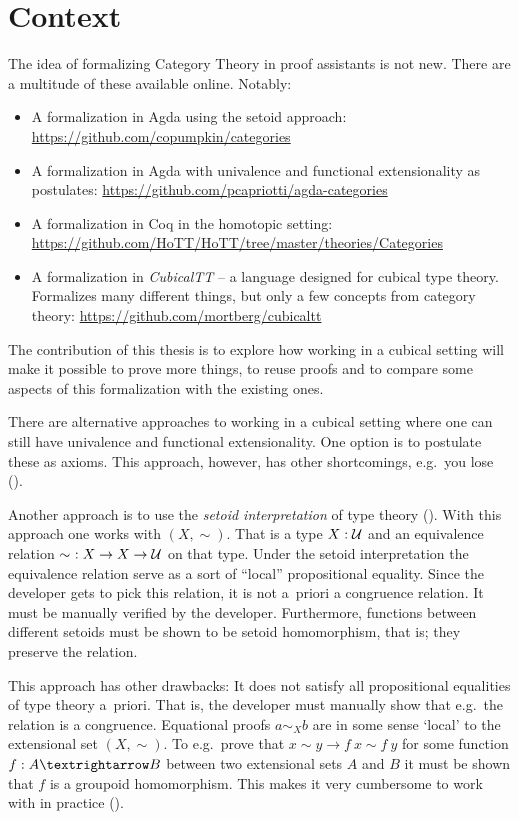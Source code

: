 \section{Context}
\label{sec:context}
%
The idea of formalizing Category Theory in proof assistants is not new.  There
are a multitude of these available online.  Notably:
%
\begin{itemize}
\item
  A formalization in Agda using the setoid approach:
  \url{https://github.com/copumpkin/categories}
\item
  A formalization in Agda with univalence and functional
  extensionality as postulates:
  \url{https://github.com/pcapriotti/agda-categories}
\item
  A formalization in Coq in the homotopic setting:
  \url{https://github.com/HoTT/HoTT/tree/master/theories/Categories}
\item
  A formalization in \emph{CubicalTT} -- a language designed for
  cubical type theory.  Formalizes many different things, but only a
  few concepts from category theory:
  \url{https://github.com/mortberg/cubicaltt}
\end{itemize}
%
The contribution of this thesis is to explore how working in a cubical
setting will make it possible to prove more things, to reuse proofs
and to compare some aspects of this formalization with the existing
ones.

There are alternative approaches to working in a cubical setting where
one can still have univalence and functional extensionality.  One
option is to postulate these as axioms.  This approach, however, has
other shortcomings, e.g.\ you lose 
(\cite[p.\ 3]{huber-2016}).

Another approach is to use the \emph{setoid interpretation} of type
theory (\cite{hofmann-1995,huber-2016}). With this approach one works
with  $(X, \sim)$. That is a type $X \mathrel{:}
\mathcal{U}$ and an equivalence relation $\sim\ \mathrel{:} X \to X \to \mathcal{U}$ on that
type. Under the setoid interpretation the equivalence relation serve
as a sort of ``local'' propositional equality. Since the developer
gets to pick this relation, it is not a~priori a congruence
relation. It must be manually verified by the developer.  Furthermore,
functions between different setoids must be shown to be setoid
homomorphism, that is; they preserve the relation.

This approach has other drawbacks: It does not satisfy all
propositional equalities of type theory a~priori. That is, the
developer must manually show that e.g.\ the relation is a congruence.
Equational proofs $a \sim_{X} b$ are in some sense `local' to the
extensional set $(X , \sim)$. To e.g.\ prove that $x ∼ y → f\ x ∼
f\ y$ for some function $f \tp A → B$ between two extensional sets $A$
and $B$ it must be shown that $f$ is a groupoid homomorphism. This
makes it very cumbersome to work with in practice (\cite[p.
  4]{huber-2016}).

